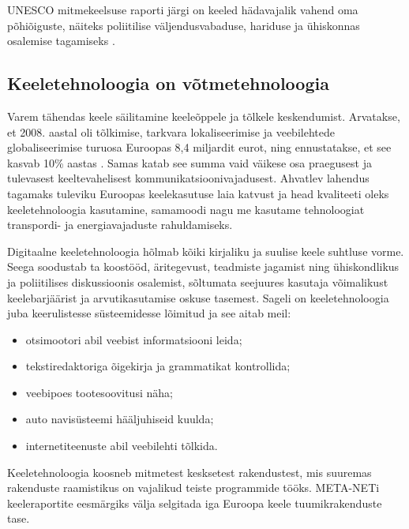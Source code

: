\begin{multicols}{2}
UNESCO mitmekeelsuse raporti järgi on keeled hädavajalik vahend oma põhiõiguste, näiteks poliitilise väljendusvabaduse, hariduse ja ühiskonnas osalemise tagamiseks \cite{Unesco1}.


\subsection{Keeletehnoloogia on võtmetehnoloogia}

Varem tähendas keele säilitamine keeleõppele ja tõlkele keskendumist.
Arvatakse, et 2008. aastal oli tõlkimise, tarkvara lokaliseerimise ja veebilehtede globalisee\-ri\-mise turuosa Euroopas 8,4 miljardit {eurot}, ning ennustatakse, et see kasvab 10\% aastas \cite{EC3}. 
Samas katab see summa vaid väikese osa praegusest ja tulevasest keeltevahelisest kommunikatsioonivajadusest. 
Ahvatlev lahendus tagamaks tuleviku Euroopas keelekasutuse laia katvust ja head kvaliteeti oleks keeletehnoloogia kasutamine, samamoodi nagu me kasutame tehnoloogiat transpordi- ja energiavajaduste rahuldamiseks.

Digitaalne keeletehnoloogia hõlmab kõiki kirjaliku ja suulise keele suhtluse vorme. 
Seega soodustab ta koostööd, äritegevust, teadmiste jagamist ning ühiskondlikus ja poliitilises diskussioonis osalemist, sõltumata seejuures kasutaja võimalikust keelebarjäärist ja arvutikasutamise oskuse tasemest.
Sageli on keeletehno\-loogia juba keerulistesse süsteemi\-desse lõimitud ja see aitab meil:
\begin{itemize}
      \item otsimootori abil veebist informatsiooni leida;
      \item tekstiredaktoriga õigekirja ja grammatikat kontrollida;
      \item veebipoes tootesoovitusi näha;
      \item auto navisüsteemi hääljuhiseid kuulda;
      \item internetiteenuste abil veebilehti tõl\-kida.
    \end{itemize}

Keeletehnoloogia koosneb mitmetest kesk\-setest raken\-dustest, mis suuremas raken\-duste raamistikus on vajalikud teiste prog\-rammide tööks. 
META-NETi keele\-raportite eesmärgiks välja selgitada iga Euroopa keele tuumikrakenduste tase.




\end{multicols}
